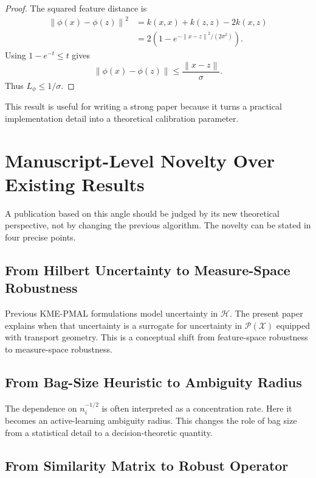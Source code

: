 \documentclass[10pt,journal]{IEEEtran}
\newcommand{\Pcal}{\mathcal{P}}
\newcommand{\Xcal}{\mathcal{X}}
\newcommand{\Hcal}{\mathcal{H}}
\newcommand{\norm}[1]{\left\lVert #1 \right\rVert}
\begin{document}
\begin{proof}
The squared feature distance is
\begin{equation}
\begin{aligned}
\norm{\phi(x)-\phi(z)}^2
&=k(x,x)+k(z,z)-2k(x,z)\\
&=2\left(1-e^{-\norm{x-z}^2/(2\sigma^2)}\right).
\end{aligned}
\end{equation}
Using $1-e^{-t}\le t$ gives
\begin{equation}
    \norm{\phi(x)-\phi(z)}\le \frac{\norm{x-z}}{\sigma}.
\end{equation}
Thus $L_\phi\le 1/\sigma$.
\end{proof}

This result is useful for writing a strong paper because it turns a practical implementation detail into a theoretical calibration parameter.

\section{Manuscript-Level Novelty Over Existing Results}
\label{sec:novelty}

A publication based on this angle should be judged by its new theoretical perspective, not by changing the previous algorithm. The novelty can be stated in four precise points.

\subsection{From Hilbert Uncertainty to Measure-Space Robustness}

Previous KME-PMAL formulations model uncertainty in $\Hcal$. The present paper explains when that uncertainty is a surrogate for uncertainty in $\Pcal(\Xcal)$ equipped with transport geometry. This is a conceptual shift from feature-space robustness to measure-space robustness.

\subsection{From Bag-Size Heuristic to Ambiguity Radius}

The dependence on $n_i^{-1/2}$ is often interpreted as a concentration rate. Here it becomes an active-learning ambiguity radius. This changes the role of bag size from a statistical detail to a decision-theoretic quantity.

\subsection{From Similarity Matrix to Robust Operator}
\end{document}
